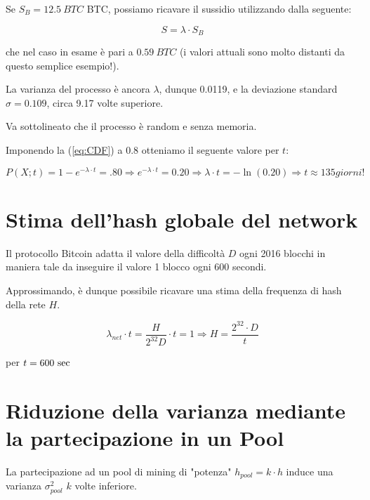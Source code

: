 \documentclass{book}
\theoremstyle{definition}
\begin{document}
Se $S_{B} = 12.5 \ BTC$ BTC, possiamo ricavare il sussidio utilizzando dalla seguente:

\begin{equation}
    S = \lambda \cdot S_{B} \label{eq:lamdaToSubside}
\end{equation}

che nel caso in esame è pari a $0.59 \ BTC$ (i valori attuali sono molto distanti da questo semplice esempio!).

La varianza del processo è ancora $\lambda$, dunque 0.0119, e la deviazione standard $\sigma = 0.109$, circa 9.17 volte superiore.

Va sottolineato che il processo è random e senza memoria.

Imponendo la (\ref{eq:CDF}) a 0.8 otteniamo il seguente valore per $t$:

\begin{equation}
    P(X; t) = 1 - e^{-\lambda \cdot t} = .80 \Rightarrow  e^{-\lambda \cdot t} = 0.20 \Rightarrow  {\lambda \cdot t} = -\ln(0.20) \Rightarrow t \approx 135 \textit{giorni!} 
\end{equation}

\section{Stima dell'hash globale del network} \label{stima_hash_growth}

Il protocollo Bitcoin adatta il valore della difficoltà $D$ ogni 2016 blocchi in maniera tale da inseguire il valore 1 blocco ogni 600 secondi.

Approssimando, è dunque possibile ricavare una stima della frequenza di hash della rete $H$.

\begin{equation}
    \lambda_{net} \cdot t = \frac{H}{2^{32}D} \cdot t = 1 \Rightarrow H = \frac{2^{32} \cdot D}{t} \label{lamda_net}
\end{equation}

per $t = 600 \ \textnormal{sec}$

\section{Riduzione della varianza mediante la partecipazione in un Pool}

La partecipazione ad un pool di mining di "potenza" $h_{\textit{pool}} = k \cdot h$ induce una varianza $\sigma_{\textit{pool}}^{2}$ $k$ volte inferiore.
\end{document}
